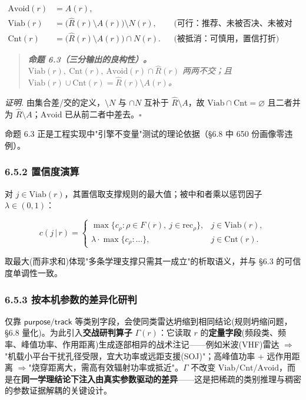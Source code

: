 \documentclass[12pt,a4paper]{ctexart}
\begin{document}
\[\begin{aligned}
\mathrm{Avoid}(r) &= A(r),\\
\mathrm{Viab}(r) &= \big(\widehat{R}(r)\setminus A(r)\big)\setminus N(r), &&\text{(可行：推荐、未被否决、未被对方抗干扰中和)}\\
\mathrm{Cnt}(r) &= \big(\widehat{R}(r)\setminus A(r)\big)\cap N(r). &&\text{(被抵消：可慎用，置信打折)}
\end{aligned}\]

\begin{quote}\itshape \textbf{命题 6.3（三分输出的良构性）。} $\mathrm{Viab}(r),\ \mathrm{Cnt}(r),\ \mathrm{Avoid}(r)\cap\widehat R(r)$ 两两不交；且 $\mathrm{Viab}(r)\cup\mathrm{Cnt}(r)=\widehat{R}(r)\setminus A(r)$。\end{quote}

\textit{证明.} 由集合差/交的定义，$\setminus N$ 与 $\cap N$ 互补于 $\widehat R\setminus A$，故 $\mathrm{Viab}\cap\mathrm{Cnt}=\varnothing$ 且二者并为 $\widehat R\setminus A$；$\mathrm{Avoid}$ 已从前二者中差去。$\square$

命题 6.3 正是工程实现中"引擎不变量"测试的理论依据（§6.8 中 650 份画像零违例）。

\subsubsection*{6.5.2 置信度演算}

对 $j\in\mathrm{Viab}(r)$，其置信取支撑规则的最大值；被中和者乘以惩罚因子 $\lambda\in(0,1)$：

\[c(j\,|\,r)=\begin{cases}\max\{c_\rho:\rho\in F(r),\ j\in\mathrm{rec}_\rho\}, & j\in\mathrm{Viab}(r),\\[2pt]\lambda\cdot\max\{c_\rho:\dots\}, & j\in\mathrm{Cnt}(r).\end{cases}\]

取最大(而非求和)体现"多条学理支撑只需其一成立"的析取语义，并与 §6.3 的可信度单调性一致。

\subsubsection*{6.5.3 按本机参数的差异化研判}

仅靠 $\mathsf{purpose}/\mathsf{track}$ 等类别字段，会使同类雷达坍缩到相同结论(规则坍缩问题，§6.8 量化)。为此引入\textbf{交战研判算子} $\Gamma(r)$：它读取 $r$ 的\textbf{定量字段}(频段类、频率、峰值功率、作用距离)生成逐部相异的战术注记——例如米波(VHF)雷达 $\Rightarrow$"机载小平台干扰孔径受限，宜大功率或远距支援(SOJ)"；高峰值功率 + 远作用距离 $\Rightarrow$"烧穿距离大，需高有效辐射功率或抵近"。$\Gamma$ 不改变 $\mathrm{Viab}/\mathrm{Cnt}/\mathrm{Avoid}$，而是在\textbf{同一学理结论下注入由真实参数驱动的差异}——这是把稀疏的类别推理与稠密的参数证据解耦的关键设计。
\end{document}
